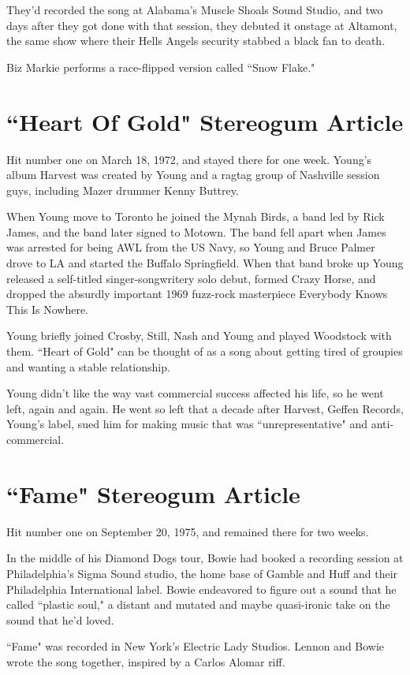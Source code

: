 \documentclass[12pt, a4paper, twoside, openright, titlepage]{book}
\begin{document}
They'd recorded the song at Alabama's Muscle Shoals Sound Studio, and two days after they got done with that session, they debuted it onstage at Altamont, the same show where their Hells Angels security stabbed a black fan to death.

Biz Markie performs a race-flipped version called ``Snow Flake."


\section{``Heart Of Gold" Stereogum Article}

Hit number one on March 18, 1972, and stayed there for one week. Young's album Harvest was created by Young and a ragtag group of Nashville session guys, including Mazer drummer Kenny Buttrey. 

When Young move to Toronto he joined the Mynah Birds, a band led by Rick James, and the band later signed to Motown. The band fell apart when James was arrested for being AWL from the US Navy, so Young and Bruce Palmer drove to LA and started the Buffalo Springfield. When that band broke up Young released a self-titled singer-songwritery solo debut, formed Crazy Horse, and dropped the absurdly important 1969 fuzz-rock masterpiece Everybody Knows This Is Nowhere. 

Young briefly joined Crosby, Still, Nash and Young and played Woodstock with them. ``Heart of Gold" can be thought of as a song about getting tired of groupies and wanting a stable relationship.

Young didn't like the way vast commercial success affected his life, so he went left, again and again. He went so left that a decade after Harvest, Geffen Records, Young's label, sued him for making music that was ``unrepresentative" and anti-commercial.


\section{``Fame" Stereogum Article}

Hit number one on September 20, 1975, and remained there for two weeks. 

In the middle of his Diamond Dogs tour, Bowie had booked a recording session at Philadelphia's Sigma Sound studio, the home base of Gamble and Huff and their Philadelphia International label. Bowie endeavored to figure out a sound that he called ``plastic soul," a distant and mutated and maybe quasi-ironic take on the sound that he'd loved.

``Fame" was recorded in New York's Electric Lady Studios. Lennon and Bowie wrote the song together, inspired by a Carlos Alomar riff. 
\end{document}
